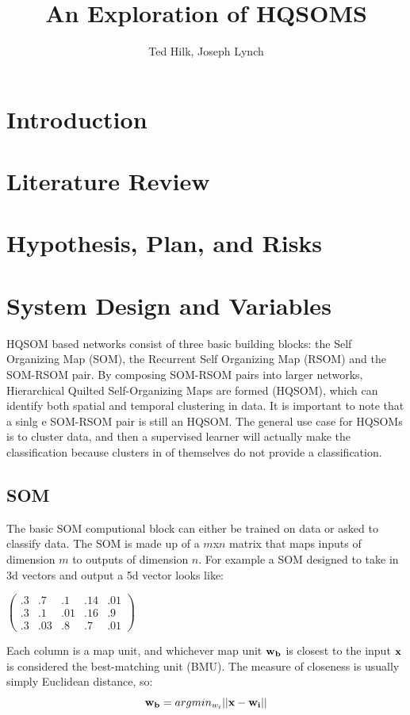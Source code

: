 \documentclass[a4paper,10pt]{article}
\title{An Exploration of HQSOMS}
\author{Ted Hilk, Joseph Lynch}
\begin{document}
\maketitle

\begin{abstract}

\end{abstract}

\section{Introduction}
\section{Literature Review}
\section{Hypothesis, Plan, and Risks}
\section{System Design and Variables}
HQSOM based networks consist of three basic building blocks: the Self Organizing Map (SOM), the
Recurrent Self Organizing Map (RSOM) and the SOM-RSOM pair.  By composing SOM-RSOM pairs
into larger networks, Hierarchical Quilted Self-Organizing Maps are formed (HQSOM), which can
identify both spatial and temporal clustering in data.  It is important to note that a sinlg
e SOM-RSOM pair is still an HQSOM. The general use case for HQSOMs is to cluster data, and then a
supervised learner will actually make the classification because clusters in of themselves do not
provide a classification.
\subsection{SOM}
The basic SOM computional block can either be trained on data or asked to classify data. The SOM is
made up of a $m$x$n$ matrix that maps inputs of dimension $m$ to outputs of dimension $n$.  For
example a SOM designed to take in 3d vectors and output a 5d vector looks like:

\begin{center}
$
\begin{pmatrix}
.3 & .7 & .1  & .14 & .01\\
.3 & .1 & .01 & .16 & .9\\
.3 & .03 & .8 & .7  & .01
\end{pmatrix}
$
\end{center}
Each column is a map unit, and whichever map unit $\bold{w_b}$ is closest to the input $\bold{x}$
is considered the best-matching unit (BMU).  The measure of closeness is usually simply Euclidean
distance, so:
\begin{equation}
 \bold{w_b} = argmin_{w_i} ||\bold{x} - \bold{w_i}||
\end{equation}
 
\end{document}
